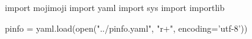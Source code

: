 \usepackage{pythontex}

\begin{pycode}
import mojimoji
import yaml
import sys
import importlib

pinfo = yaml.load(open("../pinfo.yaml", "r+", encoding='utf-8'))
\end{pycode}

\newcommand{\ZenToHan}[1]{mojimoji.zen_to_han(u'#1')}
\newcommand{\HanToZen}[1]{mojimoji.han_to_zen(u'#1')}
